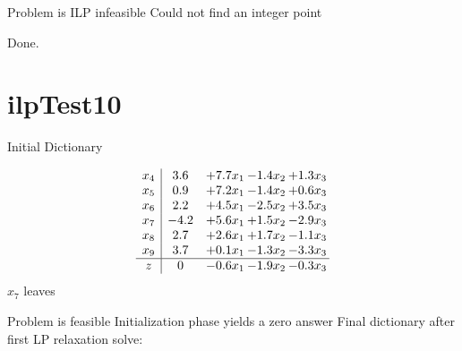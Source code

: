 \documentclass[11pt]{article}
\begin{document}
Problem is ILP infeasible Could not find an integer point 

Done.
\section{ilpTest10}

Initial Dictionary 

\[\begin{array}{c| c c@{\hskip 2pt} c@{\hskip 2pt} c@{\hskip 2pt} }
 x_{4}   &  3.6 & + 7.7 x_{1} & -1.4 x_{2} & + 1.3 x_{3}\\
 x_{5}   &  0.9 & + 7.2 x_{1} & -1.4 x_{2} & + 0.6 x_{3}\\
 x_{6}   &  2.2 & + 4.5 x_{1} & -2.5 x_{2} & + 3.5 x_{3}\\
 x_{7}   &  -4.2 & + 5.6 x_{1} & + 1.5 x_{2} & -2.9 x_{3}\\
 x_{8}   &  2.7 & + 2.6 x_{1} & + 1.7 x_{2} & -1.1 x_{3}\\
 x_{9}   &  3.7 & + 0.1 x_{1} & -1.3 x_{2} & -3.3 x_{3}\\
\hline
z    &  0 & -0.6 x_{1} & -1.9 x_{2} & -0.3 x_{3}\\
\end{array}\]
$ x_{7} $ leaves 

 Problem is feasible Initialization phase yields a zero answer 
Final dictionary after first LP relaxation solve: 
\end{document}
